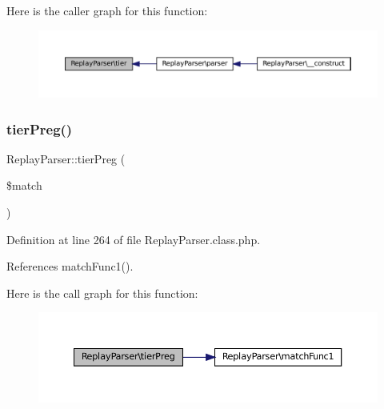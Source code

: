 Here is the caller graph for this function\+:\nopagebreak
\begin{figure}[H]
\begin{center}
\leavevmode
\includegraphics[width=350pt]{class_replay_parser_af5dd7c479acbd2646fe9d8ed37e74e79_icgraph}
\end{center}
\end{figure}
\mbox{\label{class_replay_parser_a6dbfd4792430ea1e12ce6aa9b4397ba7}} 
\subsubsection{\texorpdfstring{tier\+Preg()}{tierPreg()}}
{\footnotesize\ttfamily Replay\+Parser\+::tier\+Preg (\begin{DoxyParamCaption}\item[{}]{\$match }\end{DoxyParamCaption})}



Definition at line 264 of file Replay\+Parser.\+class.\+php.



References match\+Func1().

Here is the call graph for this function\+:\nopagebreak
\begin{figure}[H]
\begin{center}
\leavevmode
\includegraphics[width=350pt]{class_replay_parser_a6dbfd4792430ea1e12ce6aa9b4397ba7_cgraph}
\end{center}
\end{figure}
\mbox{\label{class_replay_parser_a9202833957b689cf20c4a6c166df959e}} 

